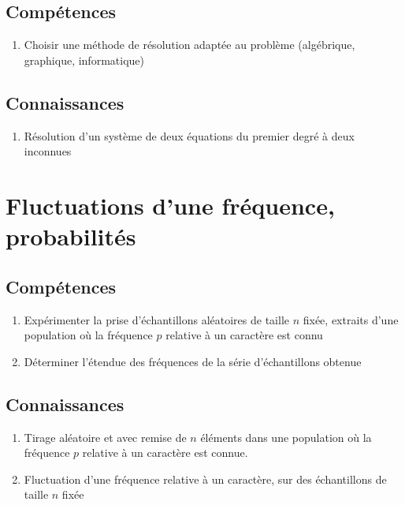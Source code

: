 \documentclass[12pt,a4paper]{article}
\begin{document}
\subsection*{Compétences}
	\begin{enumerate}
		\item Choisir une méthode de résolution adaptée au problème (algébrique, graphique, informatique)
	\end{enumerate}
	

\subsection*{Connaissances}
	\begin{enumerate}
		\item Résolution d'un système de deux équations du premier degré à deux inconnues
	\end{enumerate}





\section{Fluctuations d'une fréquence, probabilités}

\subsection*{Compétences}
\begin{enumerate}
	\item Expérimenter la prise d'échantillons aléatoires de taille $n$ fixée, extraits d'une population où la fréquence $p$ relative à un caractère est connu
	\item Déterminer l'étendue des fréquences de la série d'échantillons obtenue
\end{enumerate}

\subsection*{Connaissances}
\begin{enumerate}
	\item Tirage aléatoire  et avec remise de $n$ éléments dans une population où la fréquence $p$ relative à un caractère est connue.
	\item Fluctuation d'une fréquence relative à un caractère, sur des échantillons de taille $n$ fixée
\end{enumerate}
\end{document}
